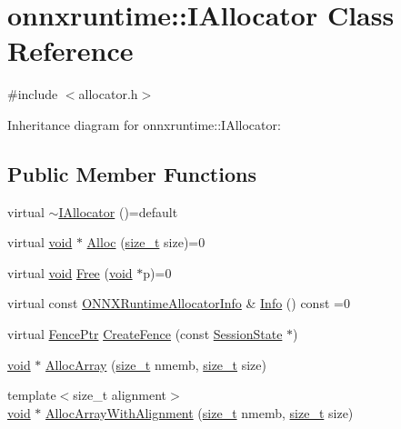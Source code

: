 \hypertarget{classonnxruntime_1_1IAllocator}{}\section{onnxruntime\+:\+:I\+Allocator Class Reference}
\label{classonnxruntime_1_1IAllocator}


{\ttfamily \#include $<$allocator.\+h$>$}



Inheritance diagram for onnxruntime\+:\+:I\+Allocator\+:
\subsection*{Public Member Functions}
\begin{DoxyCompactItemize}
\item 
virtual \mbox{\hyperlink{classonnxruntime_1_1IAllocator_a0ba4d40b4b142731ff4511a2053bb72c}{$\sim$\+I\+Allocator}} ()=default
\item 
virtual \mbox{\hyperlink{mlasi_8h_a88f941d423cb2a819b70a1358982b1a6}{void}} $\ast$ \mbox{\hyperlink{classonnxruntime_1_1IAllocator_a765590df724d3e7805c1dddbfe290b11}{Alloc}} (\mbox{\hyperlink{mlasi_8h_a503efbc1c6e50825320ad909366b78ab}{size\+\_\+t}} size)=0
\item 
virtual \mbox{\hyperlink{mlasi_8h_a88f941d423cb2a819b70a1358982b1a6}{void}} \mbox{\hyperlink{classonnxruntime_1_1IAllocator_aeab273380d08b613b584c9e50deeb5f9}{Free}} (\mbox{\hyperlink{mlasi_8h_a88f941d423cb2a819b70a1358982b1a6}{void}} $\ast$p)=0
\item 
virtual const \mbox{\hyperlink{structONNXRuntimeAllocatorInfo}{O\+N\+N\+X\+Runtime\+Allocator\+Info}} \& \mbox{\hyperlink{classonnxruntime_1_1IAllocator_a384b9f03d2346999b7b9ce3b225982a3}{Info}} () const =0
\item 
virtual \mbox{\hyperlink{namespaceonnxruntime_a42d52aa37e4dba8c02178f81eda99eeb}{Fence\+Ptr}} \mbox{\hyperlink{classonnxruntime_1_1IAllocator_aac50b97886138b30cd0b7b3506fea459}{Create\+Fence}} (const \mbox{\hyperlink{classonnxruntime_1_1SessionState}{Session\+State}} $\ast$)
\item 
\mbox{\hyperlink{mlasi_8h_a88f941d423cb2a819b70a1358982b1a6}{void}} $\ast$ \mbox{\hyperlink{classonnxruntime_1_1IAllocator_a9692f660ab4bd7ef7736ee38c71e5970}{Alloc\+Array}} (\mbox{\hyperlink{mlasi_8h_a503efbc1c6e50825320ad909366b78ab}{size\+\_\+t}} nmemb, \mbox{\hyperlink{mlasi_8h_a503efbc1c6e50825320ad909366b78ab}{size\+\_\+t}} size)
\item 
{\footnotesize template$<$size\+\_\+t alignment$>$ }\\\mbox{\hyperlink{mlasi_8h_a88f941d423cb2a819b70a1358982b1a6}{void}} $\ast$ \mbox{\hyperlink{classonnxruntime_1_1IAllocator_a228f7213f74cc1fd27c0767f51ec3c8e}{Alloc\+Array\+With\+Alignment}} (\mbox{\hyperlink{mlasi_8h_a503efbc1c6e50825320ad909366b78ab}{size\+\_\+t}} nmemb, \mbox{\hyperlink{mlasi_8h_a503efbc1c6e50825320ad909366b78ab}{size\+\_\+t}} size)
\end{DoxyCompactItemize}
